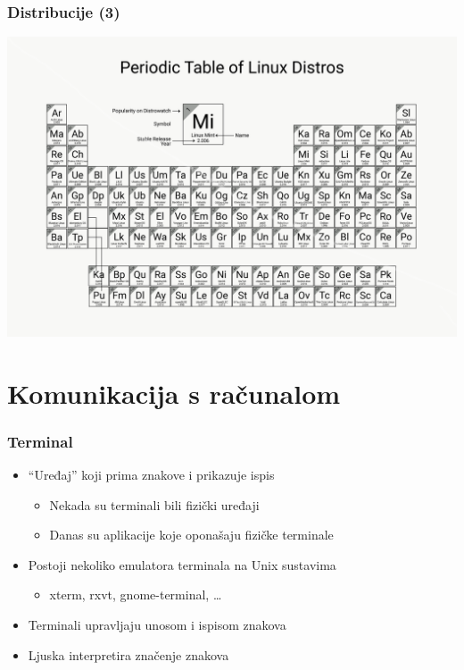 \documentclass{beamer}
\begin{document}
\begin{frame}
\frametitle{Distribucije (3)}
\includegraphics[width=1.0\textwidth,height=0.8\textheight]{periodic-table.png}
\end{frame}

\section{Komunikacija s računalom}
\begin{frame}[t]
\frametitle{Terminal}
\begin{itemize}
  \item ``Uređaj'' koji prima znakove i prikazuje ispis
  \begin{itemize}
    \item Nekada su terminali bili fizički uređaji
    \item Danas su aplikacije koje oponašaju fizičke terminale
  \end{itemize}
  \item Postoji nekoliko emulatora terminala na Unix sustavima
  \begin{itemize}
    \item xterm, rxvt, gnome-terminal, \ldots
  \end{itemize}
  \item Terminali upravljaju unosom i ispisom znakova
  \item Ljuska interpretira značenje znakova
\end{itemize}
\end{frame}
\end{document}
